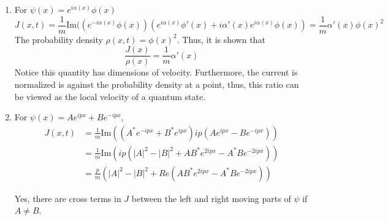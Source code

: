 \begin{sol}
\begin{enumerate}[label=\textbf{(\alph*)}]
   \item 
   For $\psi(x)=e^{i\alpha(x)}\phi(x)$
   \begin{equation}
        J(x,t)=\frac{1}{m}\text{Im}((e^{-i\alpha(x)}\phi(x))(e^{i\alpha(x)}\phi'(x)+i\alpha'(x)e^{i\alpha(x)}\phi(x))=\frac{1}{m}\alpha'(x)\phi(x)^2
   \end{equation}
   The probability density $\rho(x,t)=\phi(x)^2$. Thus, it is shown that
   \begin{equation}
    \frac{J(x)}{\rho(x)}=\frac{1}{m}\alpha'(x)
   \end{equation}
Notice this quantity has dimensions of velocity. Furthermore, the current is normalized is against the probability density at a point, thus, this ratio can be viewed as the local velocity of a quantum state.
\item
For $\psi(x)=Ae^{ipx}+Be^{-ipx}$,
\begin{equation}
    \begin{aligned}
        J(x,t)&=\frac{1}{m}\text{Im}((A^*e^{-ipx}+B^*e^{ipx})ip(Ae^{ipx}-Be^{-ipx}))\\
        &=\frac{1}{m}\text{Im}(ip(|A|^2-|B|^2+AB^*e^{2ipx}-A^*Be^{-2ipx}))\\
        &=\frac{p}{m}(|A|^2-|B|^2+Re(AB^*e^{2ipx}-A^*Be^{-2ipx}))
    \end{aligned}
\end{equation}

Yes, there are cross terms in $J$ between the left and right moving parts of $\psi$ if $A\neq B$.

\end{enumerate}
\end{sol}